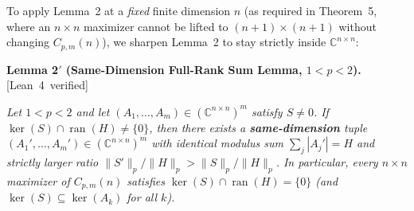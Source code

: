 \documentclass[10pt,letterpaper]{article}
\newcommand{\leanbadge}[1]{\mbox{\sffamily\scriptsize\color{leanborder}[#1]}}
\newcommand{\C}{\mathbb{C}}
\newcommand{\ran}{\operatorname{ran}}
\begin{document}
To apply Lemma~2 at a \emph{fixed} finite dimension $n$ (as required in Theorem~5, where an $n\times n$ maximizer cannot be lifted to $(n+1)\times(n+1)$ without changing $C_{p,m}(n)$), we sharpen Lemma~2 to stay strictly inside $\C^{n\times n}$:

\begin{tcolorbox}[lemmabox]
\textbf{Lemma 2$'$ (Same-Dimension Full-Rank Sum Lemma, $1 < p < 2$).}\hfill\leanbadge{Lean~4 verified}\par\vspace{1.5pt}
\emph{Let $1 < p < 2$ and let $(A_1,\dots,A_m) \in (\C^{n\times n})^m$ satisfy $S \neq 0$. If $\ker(S) \cap \ran(H) \neq \{0\}$, then there exists a \textbf{same-dimension} tuple $(A_1',\dots,A_m') \in (\C^{n\times n})^m$ with identical modulus sum $\sum_j |A_j'| = H$ and strictly larger ratio $\|S'\|_p / \|H\|_p > \|S\|_p / \|H\|_p$. In particular, every $n\times n$ maximizer of $C_{p,m}(n)$ satisfies $\ker(S) \cap \ran(H) = \{0\}$ (and $\ker(S) \subseteq \ker(A_k)$ for all $k$).}
\end{tcolorbox}
\end{document}
